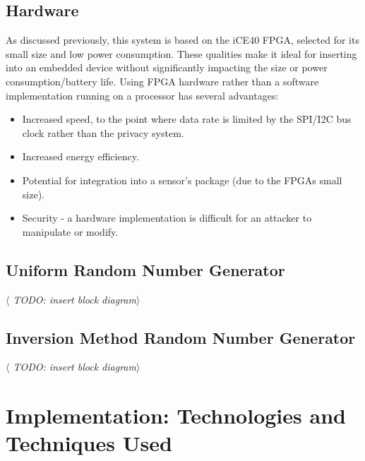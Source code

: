 \documentclass[12pt]{article}
\begin{document}
    \subsection{Hardware}
      As discussed previously, this system is based on the iCE40 FPGA, selected for its small size and low power consumption. These qualities make it ideal for inserting into an embedded device without significantly impacting the size or power consumption/battery life. Using FPGA hardware rather than a software implementation running on a processor has several advantages:

      \begin{itemize}
        \item Increased speed, to the point where data rate is limited by the SPI/I2C bus clock rather than the privacy system.
        \item Increased energy efficiency.
        \item Potential for integration into a sensor's package (due to the FPGAs small size).
        \item Security - a hardware implementation is difficult for an attacker to manipulate or modify.
      \end{itemize}

    \subsection{Uniform Random Number Generator}
      \textit{$\langle$ TODO: insert block diagram$\rangle$}

    \subsection{Inversion Method Random Number Generator}
      \textit{$\langle$ TODO: insert block diagram$\rangle$}

\newpage



%
%

\section{Implementation: Technologies and Techniques Used}
\end{document}
